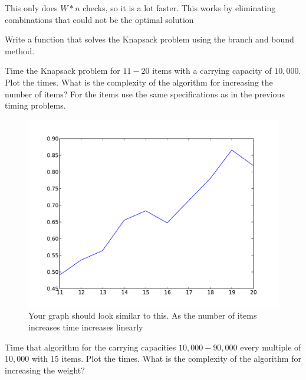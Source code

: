 This only does $W*n$ checks, so it is a lot faster. This works by eliminating combinations that could not be the optimal solution

\begin{problem}
Write a function that solves the Knapsack problem using the branch and bound method.
\end{problem}

\begin{problem}
Time the Knapsack problem for $11-20$ items with a carrying capacity of $10,000$. Plot the times. What is the complexity of the algorithm for increasing the number of items? For the items use the same specifications as in the previous timing problems.
\end{problem}

\begin{figure}[H]
\includegraphics[scale = .5]{dynamicTime.pdf}
\caption{Your graph should look similar to this. As the number of items increases time increases linearly}
\end{figure}

\begin{problem}
Time that algorithm for the carrying capacities $10,000-90,000$ every multiple of $10,000$ with $15$ items. Plot the times. What is the complexity of the algorithm for increasing the weight?
\end{problem}

